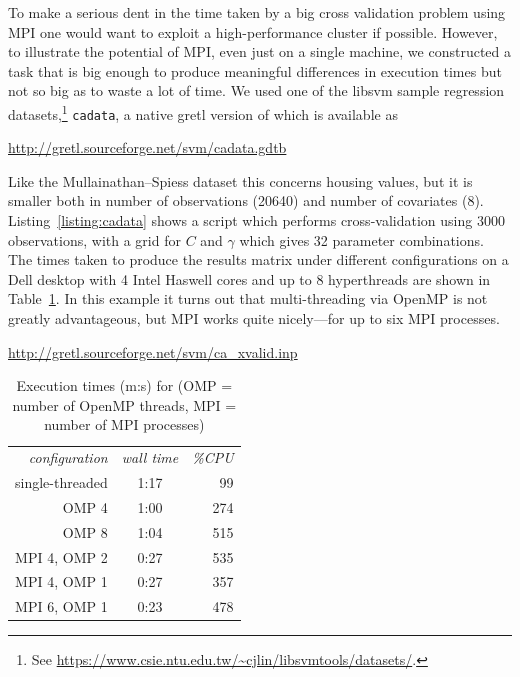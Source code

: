\documentclass{article}
\begin{document}
To make a serious dent in the time taken by a big cross validation
problem using MPI one would want to exploit a high-performance cluster
if possible. However, to illustrate the potential of MPI, even just on
a single machine, we constructed a task that is big enough to produce
meaningful differences in execution times but not so big as to waste a
lot of time. We used one of the \textsf{libsvm} sample regression
datasets,\footnote{See
  \url{https://www.csie.ntu.edu.tw/~cjlin/libsvmtools/datasets/}.}
\texttt{cadata}, a native gretl version of which is available as

\url{http://gretl.sourceforge.net/svm/cadata.gdtb}

Like the Mullainathan--Spiess dataset this concerns housing values,
but it is smaller both in number of observations (20640) and number of
covariates (8).  Listing~\ref{listing:cadata} shows a script which
performs cross-validation using 3000 observations, with a grid for $C$
and $\gamma$ which gives 32 parameter combinations. The times taken to
produce the results matrix under different configurations on a Dell
desktop with 4 Intel Haswell cores and up to 8 hyperthreads are shown
in Table~\ref{tab:cadata}. In this example it turns out that
multi-threading via \textsf{OpenMP} is not greatly advantageous, but
MPI works quite nicely---for up to six MPI processes.

\begin{script}[htbp]
  \caption{Parameter search, script }
  \label{listing:cadata}
  \begin{center}
    {\small
    \url{http://gretl.sourceforge.net/svm/ca_xvalid.inp}}
  \end{center}
\end{script}

\begin{table}[htbp]
\centering
\begin{tabular}{rcr}
\textit{configuration} & \textit{wall time} & \textit{\%CPU} \\
single-threaded & 1:17 & 99 \\
OMP 4 & 1:00 & 274 \\
OMP 8 & 1:04 & 515 \\
MPI 4, OMP 2 & 0:27 & 535 \\
MPI 4, OMP 1 & 0:27 & 357 \\
MPI 6, OMP 1 & 0:23 & 478
\end{tabular}
\caption{Execution times (m:s) for  (OMP =
  number of OpenMP threads, MPI = number of MPI processes)}
\label{tab:cadata}
\end{table}
\end{document}
